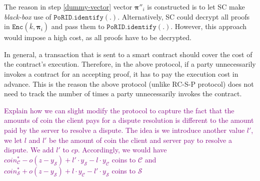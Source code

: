 \begin{remark}
The reason in step \ref{dummy-vector} vector $ {\bm{\pi}}''_{\scriptscriptstyle i}$ is constructed  is to let SC make \emph{black-box}  use of $\mathtt{PoRID.identify}(.)$. Alternatively, SC could decrypt all proofs in $\mathtt{Enc}(\bar{k}, {\bm{\pi}}_{\scriptscriptstyle i})$ and pass them to $\mathtt{PoRID.identify}(.)$. However, this approach would impose a high cost, as all proofs have to be decrypted. 
\end{remark}

\begin{remark}
In general, a transaction that is sent   to a smart contract should  cover the cost of the contract's execution. Therefore, in the above protocol, if a party unnecessarily invokes a contract for an accepting proof, it has to pay the execution cost in advance. This is the reason the above protocol (unlike RC-S-P protocol) does not need to track the number of times a party unnecessarily invokes the contract.    
\end{remark}


\begin{remark}
\textcolor{purple}{Explain how we can slight modify the protocol to capture the fact  that the amounts of coin the client pays for a dispute resolution is different to the amount paid by the server to resolve a dispute. The idea is we introduce another value $l'$, we let $l$ and $l'$ be the amount of coin the client and server pay to resolve a dispute.  We add $l'$ to $cp$. Accordingly, we would have $coin^{\scriptscriptstyle *}_{\scriptscriptstyle\mathcal C}-o(z-y_{\scriptscriptstyle\mathcal S})+l'\cdot y_{\scriptscriptstyle\mathcal S}-l\cdot y_{\scriptscriptstyle\mathcal C}$ coins  to $\mathcal C$ and  $coin^{\scriptscriptstyle *}_{\scriptscriptstyle\mathcal S}+o(z-y_{\scriptscriptstyle\mathcal S})+l\cdot y_{\scriptscriptstyle\mathcal C}-l'\cdot y_{\scriptscriptstyle\mathcal S}$ coins to $\mathcal S$}
\end{remark}



%



